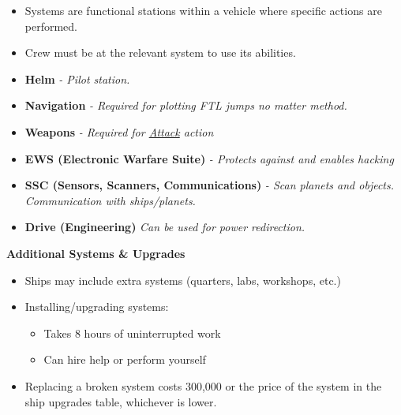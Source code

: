 \begin{scifitablebox}[screenbox,title=\textcolor{PanelGlow}{Vehicle Systems}]
\begin{itemize}
\item Systems are functional stations within a vehicle where specific actions are performed.
\item Crew must be at the relevant system to use its abilities.
\end{itemize}
\begin{itemize}
\item \textbf{Helm} \textit{- Pilot station.}
\item \textbf{Navigation} \textit{- Required for plotting FTL jumps no matter method.}
\item \textbf{Weapons} \textit{- Required for \underline{Attack} action}
\item \textbf{EWS (Electronic Warfare Suite)} \textit{- Protects against and enables hacking}
\item \textbf{SSC (Sensors, Scanners, Communications)} \textit{- Scan planets and objects. Communication with ships/planets.}
\item \textbf{Drive (Engineering)} \textit{Can be used for power redirection.}
\end{itemize}

\textbf{Additional Systems \& Upgrades}
\begin{itemize}
\item Ships may include extra systems (quarters, labs, workshops, etc.)
\item Installing/upgrading systems:
\begin{itemize}
\item Takes 8 hours of uninterrupted work
\item Can hire help or perform yourself
\end{itemize}
\item Replacing a broken system costs 300,000 or the price of the system in the ship upgrades table, whichever is lower.
\end{itemize}
\end{scifitablebox}


